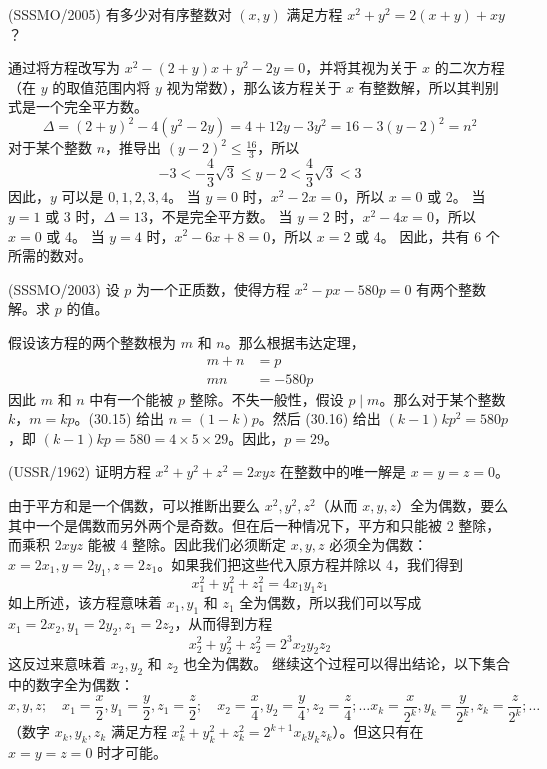 \begin{questions}
\question (SSSMO/2005) 有多少对有序整数对 $(x,y)$ 满足方程 $x^2+y^2=2(x+y)+xy$？

\begin{solution}
通过将方程改写为 $x^2-(2+y)x+y^2-2y=0$，并将其视为关于 $x$ 的二次方程（在 $y$ 的取值范围内将 $y$ 视为常数），那么该方程关于 $x$ 有整数解，所以其判别式是一个完全平方数。
\[
\Delta = (2+y)^2-4(y^2-2y)=4+12y-3y^2=16-3(y-2)^2=n^2
\]
对于某个整数 $n$，推导出 $(y-2)^2 \le \frac{16}{3}$，所以
\[
-3 < -\frac{4}{3}\sqrt{3} \le y-2 < \frac{4}{3}\sqrt{3} < 3
\]
因此，$y$ 可以是 $0, 1, 2, 3, 4$。
当 $y=0$ 时，$x^2-2x=0$，所以 $x=0$ 或 2。
当 $y=1$ 或 3 时，$\Delta=13$，不是完全平方数。
当 $y=2$ 时，$x^2-4x=0$，所以 $x=0$ 或 4。
当 $y=4$ 时，$x^2-6x+8=0$，所以 $x=2$ 或 4。
因此，共有 6 个所需的数对。
\end{solution}

\question (SSSMO/2003) 设 $p$ 为一个正质数，使得方程 $x^2-px-580p=0$ 有两个整数解。求 $p$ 的值。

\begin{solution}
假设该方程的两个整数根为 $m$ 和 $n$。那么根据韦达定理，
\begin{align*}
m+n &= p \tag{30.15} \\
mn &= -580p \tag{30.16}
\end{align*}
因此 $m$ 和 $n$ 中有一个能被 $p$ 整除。不失一般性，假设 $p \mid m$。那么对于某个整数 $k$，$m=kp$。(30.15) 给出 $n=(1-k)p$。然后 (30.16) 给出 $(k-1)kp^2=580p$，即 $(k-1)kp=580=4 \times 5 \times 29$。因此，$p=29$。
\end{solution}

\question (USSR/1962) 证明方程 $x^2+y^2+z^2=2xyz$ 在整数中的唯一解是 $x=y=z=0$。

\begin{solution}
由于平方和是一个偶数，可以推断出要么 $x^2, y^2, z^2$（从而 $x, y, z$）全为偶数，要么其中一个是偶数而另外两个是奇数。但在后一种情况下，平方和只能被 2 整除，而乘积 $2xyz$ 能被 4 整除。因此我们必须断定 $x, y, z$ 必须全为偶数：$x=2x_1, y=2y_1, z=2z_1$。如果我们把这些代入原方程并除以 4，我们得到
\[
x_1^2+y_1^2+z_1^2=4x_1y_1z_1
\]
如上所述，该方程意味着 $x_1, y_1$ 和 $z_1$ 全为偶数，所以我们可以写成 $x_1=2x_2, y_1=2y_2, z_1=2z_2$，从而得到方程
\[
x_2^2+y_2^2+z_2^2=2^3 x_2y_2z_2
\]
这反过来意味着 $x_2, y_2$ 和 $z_2$ 也全为偶数。
继续这个过程可以得出结论，以下集合中的数字全为偶数：
\[
x, y, z; \quad x_1=\frac{x}{2}, y_1=\frac{y}{2}, z_1=\frac{z}{2}; \quad x_2=\frac{x}{4}, y_2=\frac{y}{4}, z_2=\frac{z}{4}; \dots x_k=\frac{x}{2^k}, y_k=\frac{y}{2^k}, z_k=\frac{z}{2^k}; \dots
\]
（数字 $x_k, y_k, z_k$ 满足方程 $x_k^2+y_k^2+z_k^2=2^{k+1}x_ky_kz_k$）。但这只有在 $x=y=z=0$ 时才可能。
\end{solution}


\end{questions}
